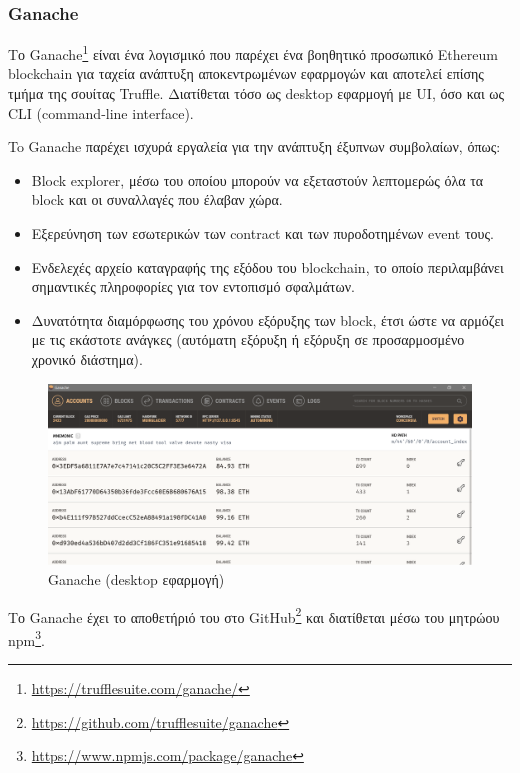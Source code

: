 \subsubsection{Ganache} \label{subsection:4-2-3-2-ganache}


Το Ganache\footnote{\url{https://trufflesuite.com/ganache/}} είναι ένα λογισμικό που παρέχει ένα βοηθητικό προσωπικό Ethereum blockchain για ταχεία ανάπτυξη αποκεντρωμένων εφαρμογών και αποτελεί επίσης τμήμα της σουίτας Truffle. Διατίθεται τόσο ως desktop εφαρμογή με UI, όσο και ως CLI (command-line interface).

To Ganache παρέχει ισχυρά εργαλεία για την ανάπτυξη έξυπνων συμβολαίων, όπως:
\begin{itemize}
	\item Block explorer, μέσω του οποίου μπορούν να εξεταστούν λεπτομερώς όλα τα block και οι συναλλαγές που έλαβαν χώρα.
	\item Εξερεύνηση των εσωτερικών των contract και των πυροδοτημένων event τους.
	\item Ενδελεχές αρχείο καταγραφής της εξόδου του blockchain, το οποίο περιλαμβάνει σημαντικές πληροφορίες για τον εντοπισμό σφαλμάτων.
	\item Δυνατότητα διαμόρφωσης του χρόνου εξόρυξης των block, έτσι ώστε να αρμόζει με τις εκάστοτε ανάγκες (αυτόματη εξόρυξη ή εξόρυξη σε προσαρμοσμένο χρονικό διάστημα).
\end{itemize}

\begin{figure}[H]
	\centering
	\includegraphics[width=\textwidth]{assets/figures/chapter-4/4.2.ganache-gui}
	\caption{Ganache (desktop εφαρμογή)}
\end{figure}

Το Ganache έχει το αποθετήριό του στο GitHub\footnote{\url{https://github.com/trufflesuite/ganache}} και διατίθεται μέσω του μητρώου npm\footnote{\url{https://www.npmjs.com/package/ganache}}.